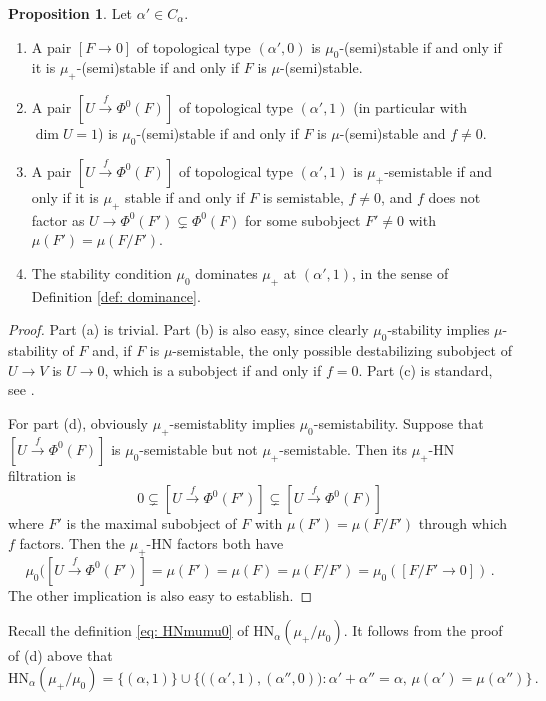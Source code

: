 \documentclass[12pt]{amsart}
\theoremstyle{definition}
\newtheorem{proposition}[definition]{Proposition}
\newcommand{\1}{\mathbf 1}
\newcommand{\HN}{\mathrm{HN}}
\begin{document}
\begin{proposition}\label{prop: characterizingstabilitypairs}
    Let $\alpha'\in C_\alpha$. 
\begin{enumerate}[label=(\alph*)]
    \item A pair $[F\to 0]$ of topological type $(\alpha', 0)$ is $\mu_0$-(semi)stable if and only if it is $\mu_+$-(semi)stable if and only if $F$ is $\mu$-(semi)stable.
    \item A pair $[U\xrightarrow{f} \Phi^0(F)]$ of topological type $(\alpha', 1)$ (in particular with $\dim U=1$) is $\mu_0$-(semi)stable if and only if $F$ is $\mu$-(semi)stable and $f\neq 0$.
    \item A pair $[U\xrightarrow{f} \Phi^0(F)]$ of topological type $(\alpha', 1)$ is $\mu_+$-semistable if and only if it is $\mu_+$ stable if and only if $F$ is semistable, $f\neq 0$, and $f$ does not factor as $U\to \Phi^0(F')\subsetneq \Phi^0(F)$ for some subobject $F'\neq 0$ with $\mu(F')=\mu(F/F')$.
    \item The stability condition $\mu_0$ dominates $\mu_+$ at $(\alpha', 1)$, in the sense of Definition \ref{def: dominance}.
\end{enumerate}
\end{proposition}
\begin{proof}
Part (a) is trivial. Part (b) is also easy, since clearly $\mu_0$-stability implies $\mu$-stability of $F$ and, if $F$ is $\mu$-semistable, the only possible destabilizing subobject of $U\to V$ is $U\to 0$, which is a subobject if and only if $f=0$. Part (c) is standard, see \cite[Example 5.6]{joyce}. 

For part (d), obviously $\mu_+$-semistablity implies $\mu_0$-semistability. Suppose that $[U\xrightarrow{f} \Phi^0(F)]$ is $\mu_0$-semistable but not $\mu_+$-semistable. Then its $\mu_+$-HN filtration is
\[0\subsetneq [U\xrightarrow{f} \Phi^0(F')]\subsetneq [U\xrightarrow{f} \Phi^0(F)]\]
where $F'$ is the maximal subobject of $F$ with $\mu(F')=\mu(F/F')$ through which $f$ factors. Then the $\mu_+$-HN factors both have
\[\mu_0([U\xrightarrow{f} \Phi^0(F')]=\mu(F')=\mu(F)=\mu(F/F')=\mu_0([F/F'\rightarrow 0])\,.\]
The other implication is also easy to establish.
\end{proof}

Recall the definition \eqref{eq: HNmumu0} of $\HN_\alpha(\mu_+/\mu_0)$. It follows from the proof of (d) above that
\[\HN_\alpha(\mu_+/\mu_0)=\{(\alpha, 1)\}\cup \{\big((\alpha', 1), (\alpha'',0)\big)\colon \alpha'+\alpha''=\alpha,\, \mu(\alpha')=\mu(\alpha'')\}\,.\]
\end{document}

